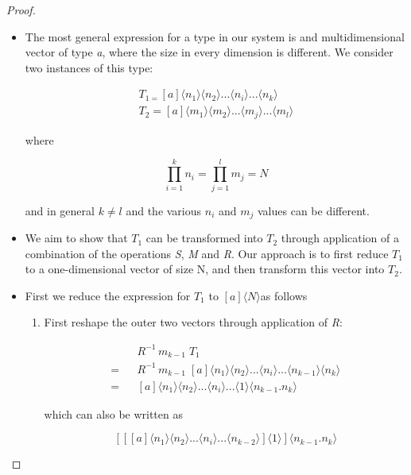 \documentclass{article}
\begin{document}
\begin{proof}

~
\begin{itemize}
\item The most general expression for a type in our system is and multidimensional
vector of type \emph{a}, where the size in every dimension is different.
We consider two instances of this type:


\begin{eqnarray*}
T_{1=}[a]\langle n_{1}\rangle\langle n_{2}\rangle...\langle n_{i}\rangle...\langle n_{k}\rangle\\
T_{2}=[a]\langle m_{1}\rangle\langle m_{2}\rangle...\langle m{}_{j}\rangle...\langle m_{l}\rangle
\end{eqnarray*}



where 


\[
\prod_{i=1}^{k}n_{i}=\prod_{j=1}^{l}m_{j}=N
\]
 


and in general $k\neq l$ and the various $n_{i}$ and $m_{j}$ values
can be different.

\item We aim to show that $T_{1}$ can be transformed into $T_{2}$ through
application of a combination of the operations \emph{S}, \emph{M}
and \emph{R}. Our approach is to first reduce $T_{1}$ to a one-dimensional
vector of size N, and then transform this vector into $T_{2}$.
\item First we reduce the expression for $T_{1}$ to $[a]\langle N\rangle$as
follows

\begin{enumerate}
\item First reshape the outer two vectors through application of \emph{R}:


\begin{eqnarray*}
 &  & R^{-1}\, m_{k-1}\; T_{1}\\
= &  & R^{-1}\, m_{k-1}\;[a]\langle n_{1}\rangle\langle n_{2}\rangle...\langle n_{i}\rangle...\langle n_{k-1}\rangle\langle n_{k}\rangle\\
= &  & [a]\langle n_{1}\rangle\langle n_{2}\rangle...\langle n_{i}\rangle...\langle1\rangle\langle n_{k-1}.n_{k}\rangle
\end{eqnarray*}
 


which can also be written as


\[
[[[a]\langle n_{1}\rangle\langle n_{2}\rangle...\langle n_{i}\rangle...\langle n_{k-2}\rangle]\langle1\rangle]\langle n_{k-1}.n_{k}\rangle
\]
 


\end{enumerate}
\end{itemize}
\end{proof}
\end{document}
